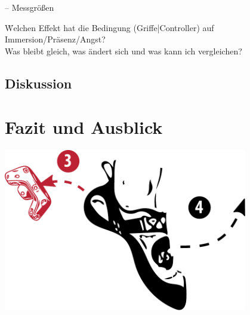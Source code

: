 \begin{frame}{\currentname{} -- Messgrößen}
\begin{tabbing}
	\textcolor{secondary}{} \quad \= Welchen Effekt hat die Bedingung (Griffe|Controller) auf Immersion/Präsenz/Angst?\\
	\mbox{} \> Was bleibt gleich, was ändert sich und was kann ich vergleichen?
\end{tabbing}

\begin{itemize}[label=\textcolor{tertiary}{}]

\end{itemize}
\end{frame}

\subsection{Diskussion}

\section{Fazit und Ausblick}

\begin{frame}[plain]
\begin{center}
	\includegraphics[width=0.8\textwidth]{include/images/climbing-shoe-with-instructions-off.pdf}
\end{center}
\end{frame}
